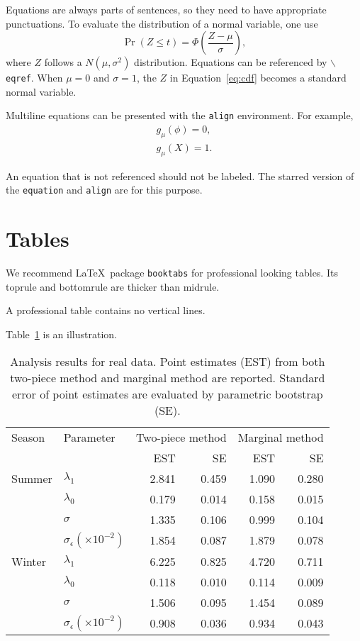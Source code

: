\documentclass[letterpaper, inpress]{jds} %
\begin{document}
Equations are always parts of sentences, so they need to have
appropriate punctuations. To evaluate the distribution of a normal
variable, one use
\begin{equation}
  \label{eq:cdf}
  \Pr(Z \le t) = \Phi\left(\frac{Z - \mu}{\sigma} \right),
\end{equation}
where $Z$ follows a $N(\mu, \sigma^2)$ distribution.
Equations can be referenced by \texttt{$\backslash$eqref}.
When $\mu = 0$ and $\sigma = 1$, the $Z$ in Equation~\eqref{eq:cdf}
becomes a standard normal variable.


Multiline equations can be presented with the \texttt{align}
environment. For example,
\begin{align*}
  g_{\mu}(\phi) = 0,\\
  g_{\mu}(X) = 1.
\end{align*}


An equation that is not referenced should not be labeled. The starred
version of the \texttt{equation} and \texttt{align} are for this purpose.

\section{Tables}%
\label{sec:tabs}

We recommend \LaTeX\ package \texttt{booktabs} for professional
looking tables. Its toprule and bottomrule are thicker than midrule.

A professional table contains no vertical lines.

Table~\ref{tab:realdata} is an illustration.
\begin{table}[tbp]
  \caption{Analysis results for real data. Point
    estimates (EST) from both two-piece method and marginal method are
    reported. Standard error of point estimates are evaluated by
    parametric bootstrap (SE).}%
  \label{tab:realdata}
  \centering
  \begin{tabular}{llrrrr}
    \toprule
    \multicolumn{1}{l}{Season} & \multicolumn{1}{l}{Parameter}
    & \multicolumn{2}{c}{Two-piece method} & \multicolumn{2}{c}{Marginal method} \\
    \cmidrule(r){3-4} \cmidrule(r){5-6}
                               & & EST & SE & EST & SE \\
    \midrule
    Summer & $\lambda_1$ & 2.841 & 0.459 & 1.090 & 0.280 \\
   & $\lambda_0$ & 0.179 & 0.014 & 0.158 & 0.015 \\
   & $\sigma$ & 1.335 & 0.106 & 0.999 & 0.104 \\
   & $\sigma_\epsilon (\times 10^{-2})$ & 1.854 & 0.087 & 1.879 & 0.078 \\
  Winter & $\lambda_1$ & 6.225 & 0.825 & 4.720 & 0.711 \\
   & $\lambda_0$ & 0.118 & 0.010 & 0.114 & 0.009 \\
   & $\sigma$ & 1.506 & 0.095 & 1.454 & 0.089 \\
   & $\sigma_\epsilon (\times 10^{-2})$ & 0.908 & 0.036 & 0.934 & 0.043 \\
    \bottomrule
  \end{tabular}
\end{table}
\end{document}
